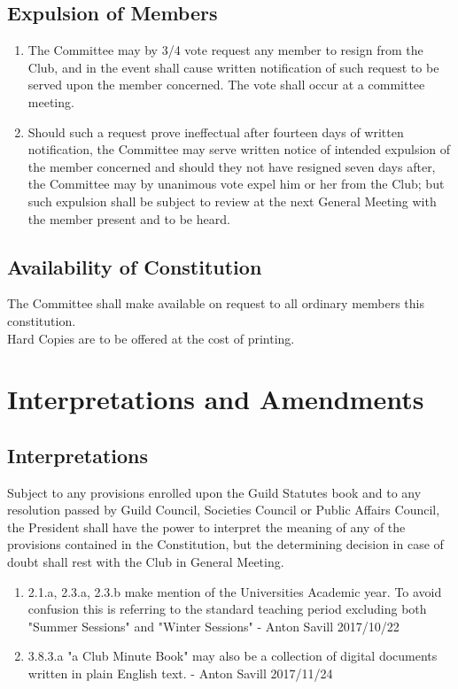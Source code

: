 \documentclass[10pt,a4paper]{report}
\begin{document}
		\section{Expulsion of Members}
			\begin{enumerate}[label=\arabic*]
				\item The Committee may by 3/4 vote request any member to resign from the Club, and in the event shall cause written notification of such request to be served upon the member concerned. The vote shall occur at a committee meeting.
				\item Should such a request prove ineffectual after fourteen days of written notification, the Committee may serve written notice of intended expulsion of the member concerned and should they not have resigned seven days after, the Committee may by unanimous vote expel him or her from the Club; but such expulsion shall be subject to review at the next General Meeting with the member present and to be heard.
			\end{enumerate}

		\section{Availability of Constitution}
			The Committee shall make available on request to all ordinary members this constitution. \\
			Hard Copies are to be offered at the cost of printing.

	\chapter{Interpretations and Amendments}

	\section{Interpretations}
		Subject to any provisions enrolled upon the Guild Statutes book and to any resolution passed by Guild Council, Societies Council or Public Affairs Council, the President shall have the power to interpret the meaning of any of the provisions contained in the Constitution, but the determining decision in case of doubt shall rest with the Club in General Meeting.
		\begin{enumerate}[label=\arabic*]
			\item 2.1.a, 2.3.a, 2.3.b make mention of the Universities Academic year. To avoid confusion this is referring to the standard teaching period excluding both "Summer Sessions" and "Winter Sessions" - Anton Savill 2017/10/22
			\item 3.8.3.a "a Club Minute Book" may also be a collection of digital documents written in plain English text. - Anton Savill  2017/11/24
		\end{enumerate}
\end{document}
